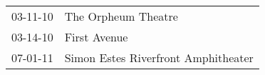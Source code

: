 \begin{supertabular}{p{0.07\textwidth}p{0.23\textwidth}}
 03-11-10 &                  The Orpheum Theatre \\
 03-14-10 &                         First Avenue \\
 07-01-11 &  Simon Estes Riverfront Amphitheater \\
\end{supertabular}
